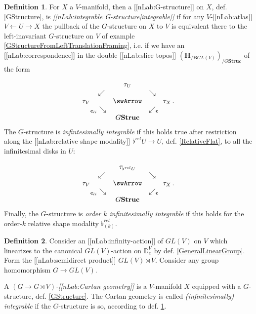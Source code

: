 \documentclass[12pt,titlepage]{article}
\def\mathllap{\mathpalette\mathllapinternal}
\def\mathrlap{\mathpalette\mathrlapinternal}
\def\mathllapinternal#1#2{\llap{$\mathsurround=0pt#1{#2}$}}
\def\mathrlapinternal#1#2{\rlap{$\mathsurround=0pt#1{#2}$}}
\newcommand{\itexarray}[1]{\begin{matrix}#1\end{matrix}}
\theoremstyle{plain}
\theoremstyle{definition}
\newtheorem{defn}{Definition}
\theoremstyle{remark}
\begin{document}
\begin{defn}
\label{IntegrabilityOfGStructure}\hypertarget{IntegrabilityOfGStructure}{}
For $X$ a $V$-manifold, then a [[nLab:G-structure]] on $X$, def. \ref{GStructure}, is \emph{[[nLab:integrable G-structure|integrable]]} if for any $V$-[[nLab:atlas]] $V \leftarrow U \rightarrow X$ the pullback of the $G$-structure on $X$ to $V$ is equivalent there to the left-inavariant $G$-structure on $V$ of example \ref{GStructureFromLeftTranslationFraming}, i.e. if we have an [[nLab:correspondence]] in the double [[nLab:slice topos]] $(\mathbf{H}_{/\mathbf{B}GL(V)})_{/G\mathbf{Struc}}$ of the form

\begin{displaymath}
\itexarray{
     && \tau_U
     \\
     & \swarrow && \searrow
     \\
     \tau_V && \swArrow && \tau_X
     \\
     & {}_{\mathllap{\mathbf{c}_{li}}}\searrow && \swarrow_{\mathrlap{\mathbf{c}}}
     \\
     && G \mathbf{Struc}
  }
  \,.
\end{displaymath}
The $G$-structure is \emph{infintesimally integrable} if this holds true after restriction along the [[nLab:relative shape modality]] $\flat^{rel} U \to U$, def. \ref{RelativeFlat}, to all the infinitesimal disks in $U$:

\begin{displaymath}
\itexarray{
     && \tau_{\flat^{rel}U}
     \\
     & \swarrow && \searrow
     \\
     \tau_V && \swArrow && \tau_X
     \\
     & {}_{\mathllap{\mathbf{c}_{li}}}\searrow && \swarrow_{\mathrlap{\mathbf{c}}}
     \\
     && G \mathbf{Struc}
  }
  \,.
\end{displaymath}
Finally, the $G$-structure is \emph{order $k$ infinitesimally integrable} if this holds for the order-$k$ relative shape modality $\flat^{rel}_{(k)}$.

\end{defn}
\begin{defn}
\label{CartanGeometry}\hypertarget{CartanGeometry}{}
Consider an [[nLab:infinity-action]] of $GL(V)$ on $V$ which linearizes to the canonical $GL(V)$-action on $\mathbb{D}^V_e$ by def. \ref{GeneralLinearGroup}. Form the [[nLab:semidirect product]] $GL(V) \rtimes V$. Consider any group homomorphism $G\to GL(V)$.

A \emph{$(G\to G\rtimes V)$-[[nLab:Cartan geometry]]} is a $V$-manifold $X$ equipped with a $G$-structure, def. \ref{GStructure}. The Cartan geometry is called \emph{(infinitesimally) integrable} if the $G$-structure is so, according to def. \ref{IntegrabilityOfGStructure}.

\end{defn}
\end{document}
